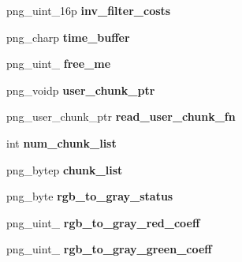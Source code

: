 \begin{DoxyCompactItemize}
\item 
\hypertarget{structpng__struct__def_a25b8f28a221e07d4d293c8cc4a810c10}{png\+\_\+uint\+\_\+16p {\bfseries inv\+\_\+filter\+\_\+costs}}\label{structpng__struct__def_a25b8f28a221e07d4d293c8cc4a810c10}

\item 
\hypertarget{structpng__struct__def_a86fa6cfea93f7277871f198fc887401e}{png\+\_\+charp {\bfseries time\+\_\+buffer}}\label{structpng__struct__def_a86fa6cfea93f7277871f198fc887401e}

\item 
\hypertarget{structpng__struct__def_a610bea16ff780c149d2756b60d2e6087}{png\+\_\+uint\+\_ {\bfseries free\+\_\+me}}\label{structpng__struct__def_a610bea16ff780c149d2756b60d2e6087}

\item 
\hypertarget{structpng__struct__def_a13fa47f71ea87fc723c35045a3240a53}{png\+\_\+voidp {\bfseries user\+\_\+chunk\+\_\+ptr}}\label{structpng__struct__def_a13fa47f71ea87fc723c35045a3240a53}

\item 
\hypertarget{structpng__struct__def_a9f47a1f6204e737229bbe35da898cba1}{png\+\_\+user\+\_\+chunk\+\_\+ptr {\bfseries read\+\_\+user\+\_\+chunk\+\_\+fn}}\label{structpng__struct__def_a9f47a1f6204e737229bbe35da898cba1}

\item 
\hypertarget{structpng__struct__def_a0a7c7070478bce0639449dce69eaac75}{int {\bfseries num\+\_\+chunk\+\_\+list}}\label{structpng__struct__def_a0a7c7070478bce0639449dce69eaac75}

\item 
\hypertarget{structpng__struct__def_a8653c890ecdb0527abed1271a8e1859f}{png\+\_\+bytep {\bfseries chunk\+\_\+list}}\label{structpng__struct__def_a8653c890ecdb0527abed1271a8e1859f}

\item 
\hypertarget{structpng__struct__def_ab29f9c9cafc3ea86e3f122a067b8161a}{png\+\_\+byte {\bfseries rgb\+\_\+to\+\_\+gray\+\_\+status}}\label{structpng__struct__def_ab29f9c9cafc3ea86e3f122a067b8161a}

\item 
\hypertarget{structpng__struct__def_a3c26e94066c10e4f4cb48137fdf1d3cf}{png\+\_\+uint\+\_ {\bfseries rgb\+\_\+to\+\_\+gray\+\_\+red\+\_\+coeff}}\label{structpng__struct__def_a3c26e94066c10e4f4cb48137fdf1d3cf}

\item 
\hypertarget{structpng__struct__def_a79a47829af14c94ec4ffe0006ef3da58}{png\+\_\+uint\+\_ {\bfseries rgb\+\_\+to\+\_\+gray\+\_\+green\+\_\+coeff}}\label{structpng__struct__def_a79a47829af14c94ec4ffe0006ef3da58}


\end{DoxyCompactItemize}

